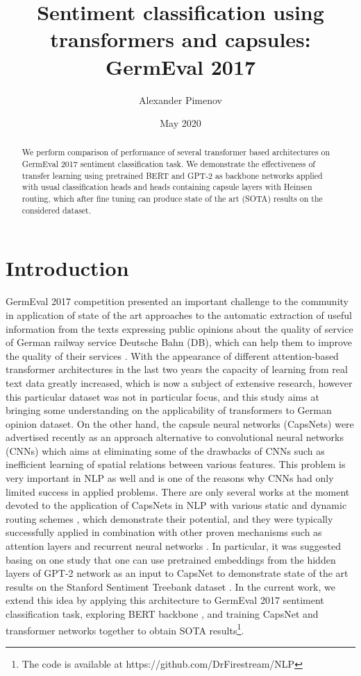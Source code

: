 \documentclass{article}
\title{Sentiment classification using transformers and capsules: GermEval 2017}
\author{Alexander Pimenov}
\date{May 2020}
\begin{document}
\maketitle
\begin{abstract}
    We perform comparison of performance of several transformer based architectures on GermEval 2017 sentiment classification task. We demonstrate the effectiveness of transfer learning using pretrained BERT and GPT-2 as backbone networks applied with usual classification heads and heads containing capsule layers with Heinsen routing, which after fine tuning can produce state of the art (SOTA) results on the considered dataset.
\end{abstract}



\section{Introduction}

GermEval 2017 competition presented an important challenge to the community in application of state of the art approaches to the automatic extraction of useful information from the texts expressing public opinions about the quality of service of German railway service Deutsche Bahn (DB), which can help them to improve the quality of their services \cite{germevaltask2017}. With the appearance of different attention-based transformer architectures in the last two years the capacity of learning from real text data greatly increased, which is now a subject of extensive research, however this particular dataset was not in particular focus, and this study aims at bringing some understanding on the applicability of transformers to German opinion dataset.  On the other hand, the capsule neural networks (CapsNets) were advertised recently as an approach alternative to convolutional neural networks (CNNs) which aims at eliminating some of the drawbacks of CNNs such as inefficient learning of spatial relations between various features. This problem is very important in NLP as well and is one of the reasons why CNNs had only limited success in applied problems. There are only several works at the moment devoted to the application of CapsNets in NLP with various static and dynamic routing schemes \cite{kim2020text}, which demonstrate their potential, and they were typically successfully applied in combination with other proven mechanisms such as attention layers \cite{xiao2018mcapsnet} and recurrent neural networks \cite{wang2018attention}. In particular, it was suggested basing on one study that one can use pretrained embeddings from the hidden layers of GPT-2 network \cite{radford2019language} as an input to CapsNet to demonstrate state of the art results on the Stanford Sentiment Treebank dataset \cite{heinsen2019algorithm}. In the current work, we extend this idea by applying this architecture to GermEval 2017 sentiment classification task, exploring BERT backbone \cite{devlin2018bert}, and training CapsNet and transformer networks together to obtain SOTA results\footnote{The code is available at https://github.com/DrFirestream/NLP}. 
\end{document}
